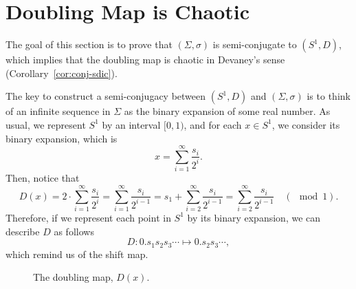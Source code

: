 \documentclass[10pt,twoside]{book}
\begin{document}
\section{Doubling Map is Chaotic}
The goal of this section is to prove that $(\Sigma, \sigma)$ is semi-conjugate to $(S^1, D)$, which implies that the doubling map is chaotic in Devaney's sense (Corollary~\ref{cor:conj-sdic}).
\begin{center}
\end{center}
The key to construct a semi-conjugacy between $(S^1,D)$ and $(\Sigma, \sigma)$ is to think of an infinite sequence in $\Sigma$ as the binary expansion of some real number.
As usual, we represent $S^1$ by an interval $[0,1)$, and for each $x \in S^1$, we consider its binary expansion, which is %
\begin{equation*}
  x = \sum\limits_{i = 1}^{\infty} \frac{s_i}{2^i}.
\end{equation*}
Then, notice that
\begin{equation*}
  D(x) = 2 \cdot \sum\limits_{i = 1}^{\infty} \frac{s_i}{2^i}
  = \sum\limits_{i = 1}^{\infty} \frac{s_i}{2^{i-1}}
  = s_1 + \sum\limits_{i = 2}^{\infty} \frac{s_i}{2^{i-1}}
  = \sum\limits_{i = 2}^{\infty} \frac{s_i}{2^{i-1}}
  \quad(\mod{1}).
\end{equation*}
Therefore, if we represent each point in $S^1$ by its binary expansion, we can describe $D$ as follows
\begin{equation*}
  D: 0.s_1 s_2 s_3 \cdots \mapsto 0.s_2 s_3 \cdots,
\end{equation*}
which remind us of the shift map.
\begin{figure}[ht]
  \centering
  \label{fig:doubling}
  \caption{The doubling map, $D(x)$.}
\end{figure}
\end{document}
